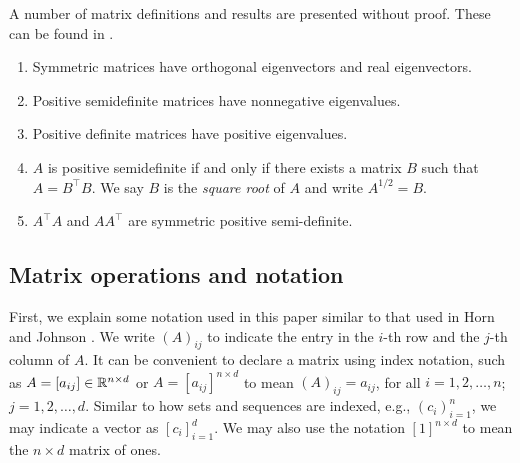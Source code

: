 A number of matrix definitions and results are presented without proof.
These can be found in \cite{horn2013matrix}.


\begin{enumerate}
    \item Symmetric matrices have orthogonal eigenvectors and real eigenvectors.
    \item Positive semidefinite matrices have nonnegative eigenvalues.
    \item Positive definite matrices have positive eigenvalues.
    \item \(A\) is positive semidefinite if and only if there exists a matrix \(B\) such that \(A = B^\top B\). We say \(B\) is the \textit{square root} of \(A\) and write \(A^{1/2} = B\).
    \item \(A^\top A\) and \(AA^\top\) are symmetric positive semi-definite.
\end{enumerate}


\subsection{Matrix operations and notation}
\label{subsec:matrix-operations}

First, we explain some notation used in this paper similar to that used in Horn and Johnson \cite{horn2013matrix}.
We write \((A)_{ij}\) to indicate the entry in the \(i\)-th row and the \(j\)-th column of \(A\).
It can be convenient to declare a matrix using index notation, such as \(A = [a_{ij}] \in \mathbb{R}^{n \times d}\) or \(A = [a_{ij}]^{n \times d}\) to mean \((A)_{ij} = a_{ij}\), for all \(i=1,2,\dots,n\); \(j = 1,2,\dots,d\).
Similar to how sets and sequences are indexed, e.g., \((c_i)_{i=1}^n\), we may indicate a vector as \([c_i]_{i=1}^d\).
We may also use the notation \([1]^{n \times d}\) to mean the \(n \times d\) matrix of ones.

